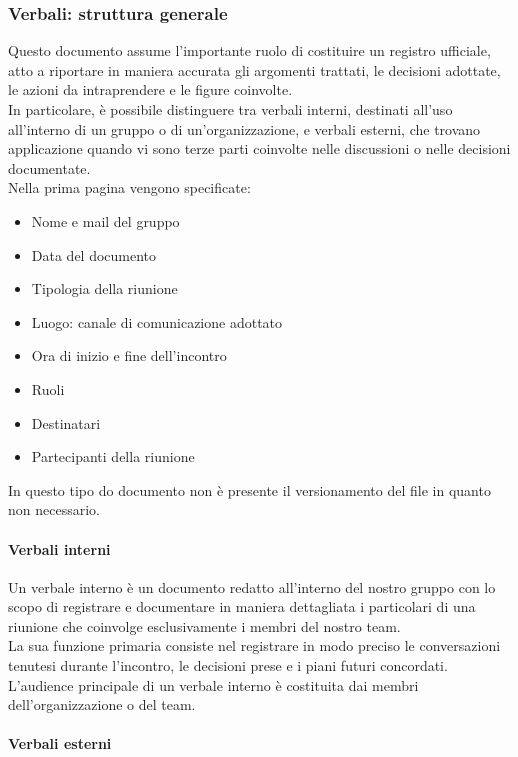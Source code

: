 \documentclass{article}
\begin{document}
\subsubsection{Verbali: struttura generale}
Questo documento assume l'importante ruolo di costituire un registro ufficiale, atto a riportare in maniera accurata gli argomenti trattati, le decisioni adottate, le azioni da intraprendere e le figure coinvolte.\\
In particolare, è possibile distinguere tra verbali interni, destinati all'uso all'interno di un gruppo o di un'organizzazione, e verbali esterni, che trovano applicazione quando vi sono terze parti coinvolte nelle discussioni o nelle decisioni documentate.\\ 
Nella prima pagina vengono specificate:
\begin{itemize}
    \item Nome e mail del gruppo
    \item Data del documento
    \item Tipologia della riunione
    \item Luogo: canale di comunicazione adottato
    \item Ora di inizio e fine dell'incontro
    \item Ruoli
    \item Destinatari
    \item Partecipanti della riunione
    
\end{itemize}
In questo tipo do documento non è presente il versionamento del file in quanto non necessario. 
\paragraph{Verbali interni}\label{sec:verbali interni}
Un verbale interno è un documento redatto all'interno del nostro gruppo con lo scopo di registrare e documentare in maniera dettagliata i particolari di una riunione che coinvolge esclusivamente i membri del nostro team.\\
La sua funzione primaria consiste nel registrare in modo preciso le conversazioni tenutesi durante l'incontro, le decisioni prese e i piani futuri concordati.\\
L'audience principale di un verbale interno è costituita dai membri dell'organizzazione o del team.

\paragraph{Verbali esterni}\label{sec:verbali esterni}
\end{document}
